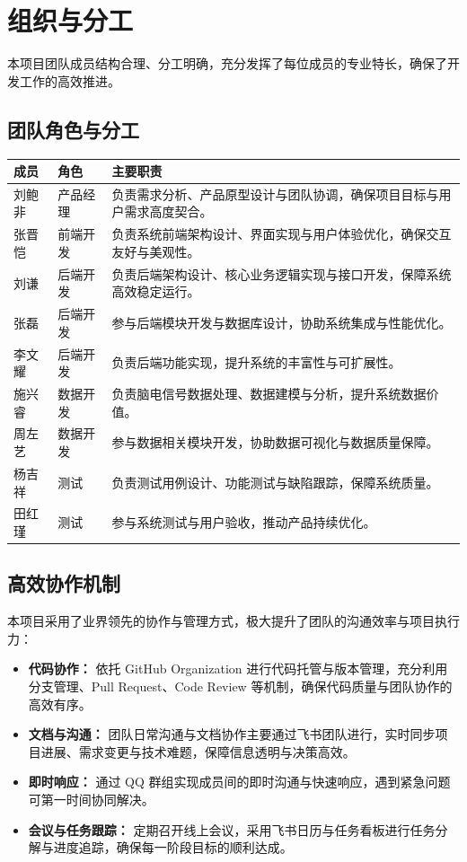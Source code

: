 \section{组织与分工}

本项目团队成员结构合理、分工明确，充分发挥了每位成员的专业特长，确保了开发工作的高效推进。

\subsection{团队角色与分工}

\begin{longtable}{|p{34mm}|p{48mm}|p{66mm}|}
\hline
\textbf{成员} & \textbf{角色} & \textbf{主要职责} \\
\hline
刘鲍非 & 产品经理 & 负责需求分析、产品原型设计与团队协调，确保项目目标与用户需求高度契合。\\
\hline
张晋恺 & 前端开发 & 负责系统前端架构设计、界面实现与用户体验优化，确保交互友好与美观性。\\
\hline
刘谦 & 后端开发 & 负责后端架构设计、核心业务逻辑实现与接口开发，保障系统高效稳定运行。\\
\hline
张磊 & 后端开发 & 参与后端模块开发与数据库设计，协助系统集成与性能优化。\\
\hline
李文耀 & 后端开发 & 负责后端功能实现，提升系统的丰富性与可扩展性。\\
\hline
施兴睿 & 数据开发 & 负责脑电信号数据处理、数据建模与分析，提升系统数据价值。\\
\hline
周左艺 & 数据开发 & 参与数据相关模块开发，协助数据可视化与数据质量保障。\\
\hline
杨吉祥 & 测试 & 负责测试用例设计、功能测试与缺陷跟踪，保障系统质量。\\
\hline
田红瑾 & 测试 & 参与系统测试与用户验收，推动产品持续优化。\\
\hline
\end{longtable}

\subsection{高效协作机制}

本项目采用了业界领先的协作与管理方式，极大提升了团队的沟通效率与项目执行力：

\begin{itemize}
	\item \textbf{代码协作：} 依托 GitHub Organization 进行代码托管与版本管理，充分利用分支管理、Pull Request、Code Review 等机制，确保代码质量与团队协作的高效有序。
	\item \textbf{文档与沟通：} 团队日常沟通与文档协作主要通过飞书团队进行，实时同步项目进展、需求变更与技术难题，保障信息透明与决策高效。
	\item \textbf{即时响应：} 通过 QQ 群组实现成员间的即时沟通与快速响应，遇到紧急问题可第一时间协同解决。
	\item \textbf{会议与任务跟踪：} 定期召开线上会议，采用飞书日历与任务看板进行任务分解与进度追踪，确保每一阶段目标的顺利达成。
\end{itemize}

